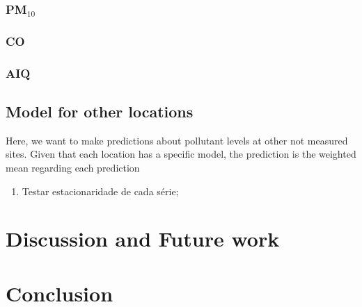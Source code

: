 \subsubsection{PM\texorpdfstring{$_{10}$}{10}}

\subsubsection{CO}

\subsubsection{AIQ}

\subsection{Model for other locations}

Here, we want to make predictions about pollutant levels at other not measured
sites. Given that each location has a specific model, the prediction
is the weighted mean regarding each prediction 

\begin{enumerate}
    \item Testar estacionaridade de cada série;
\end{enumerate}



\section{Discussion and Future work}
\label{sec:discussion}


\section{Conclusion}
\label{sec:conclusion}
